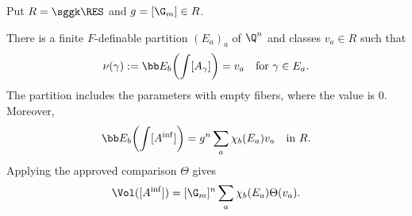 Put $R=\sggk\RES$ and $g=[\G_m]\in R$.

\begin{thm*}
There is a finite $F$-definable partition $(E_a)_a$ of $\Q^n$
and classes $v_a\in R$ such that
\begin{equation}\label{trop:fub:cons}
 \nu(\gamma):=\bb E_b\!\left(\int[A_\gamma]\right)=v_a
 \quad\text{for }\gamma\in E_a.
\end{equation}
The partition includes the parameters with empty fibers, where
the value is $0$. Moreover,
\begin{equation}\label{fubini:inflated:RES}
 \bb E_b\!\left(\int[A^{\mathrm{inf}}]\right)
   =g^n\sum_a\chi_b(E_a)v_a\quad\text{in }R.
\end{equation}
Applying the approved comparison $\Theta$ gives
\[
 \Vol([A^{\mathrm{inf}}])
   =[\G_m]^n\sum_a\chi_b(E_a)\Theta(v_a).
\]
\end{thm*}

